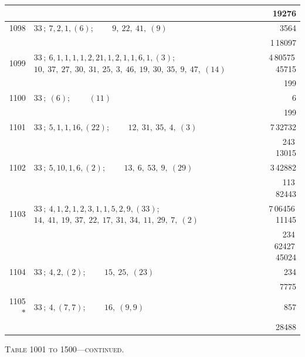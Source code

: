 \documentclass[11pt]{article}
\providecommand{\asterism}{*}
\begin{document}
\begin{longtable}{|r|p{}|r|}
 & & 19276 \\
\hline
1098 & $33\,;\ 7, 2, 1, (6)$; \ \ \ \ $9,\ 22,\ 41,\ (9)$ & 3564 \\
 & & 1\,18097 \\
\hline
1099 & $33\,;\ 6, 1, 1, 1, 1, 2, 21, 1, 2, 1, 1, 6, 1, (3)$; \ \ \ \ $10,\ 37,\ 27,\ 30,\ 31,\ 25,\ 3,\ 46,\ 19,\ 30,\ 35,\ 9,\ 47,\ (14)$ & 4\,80575\,45715 \\
 & & 199 \\
\hline
1100 & $33\,;\ (6)$; \ \ \ \ $(11)$ & 6 \\
 & & 199 \\
\hline
1101 & $33\,;\ 5, 1, 1, 16, (22)$; \ \ \ \ $12,\ 31,\ 35,\ 4,\ (3)$ & 7\,32732 \\
 & & 243\,13015 \\
\hline
1102 & $33\,;\ 5, 10, 1, 6, (2)$; \ \ \ \ $13,\ 6,\ 53,\ 9,\ (29)$ & 3\,42882 \\
 & & 113\,82443 \\
\hline
1103 & $33\,;\ 4, 1, 2, 1, 2, 3, 1, 1, 5, 2, 9, (33)$; \ \ \ \ $14,\ 41,\ 19,\ 37,\ 22,\ 17,\ 31,\ 34,\ 11,\ 29,\ 7,\ (2)$ & 7\,06456\,11145 \\
 & & 234\,62427\,45024 \\
\hline
1104 & $33\,;\ 4, 2, (2)$; \ \ \ \ $15,\ 25,\ (23)$ & 234 \\
 & & 7775 \\
\hline
1105$\asterism$ & $33\,;\ 4, (7, 7)$; \ \ \ \ $16,\ (9, 9)$ & 857 \\
 & & 28488 \\
\hline
\end{longtable}

\begin{center}
\small\textsc{Table 1001 to 1500---continued.}
\end{center}
\end{document}

